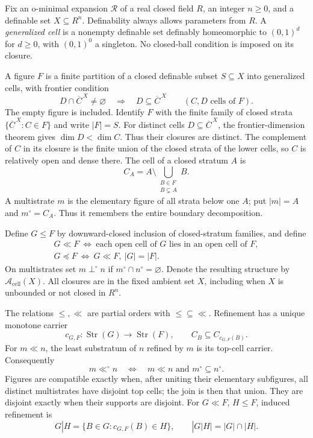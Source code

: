 \begin{definition}\label{SA21-BM-cell-definition}
Fix an o-minimal expansion \(\mathcal R\) of a real closed field \(R\),
an integer \(n\geq0\), and a definable set \(X\subseteq R^n\).
Definability always allows parameters from \(R\).
A \emph{generalized cell} is a nonempty definable set definably
homeomorphic to \((0,1)^d\) for \(d\geq0\), with \((0,1)^0\)
a singleton. No closed-ball condition is imposed on its closure.

A figure \(F\) is a finite partition of a closed definable
subset \(S\subseteq X\) into generalized cells, with frontier condition
\[
 D\cap\overline C^{\,X}\ne\varnothing
 \quad\Longrightarrow\quad D\subseteq\overline C^{\,X}
 \qquad(C,D\text{ cells of }F).
\]
The empty figure is included. Identify \(F\) with the finite
family of closed strata \(\{\overline C^{\,X}:C\in F\}\)
and write \(|F|=S\). For distinct cells \(D\subseteq\overline C^{\,X}\),
the frontier-dimension theorem
\citep[Theorem 3.22]{Coste1999} gives \(\dim D<\dim C\).
Thus their closures are distinct. The complement of \(C\)
in its closure is the finite union of the closed strata of
the lower cells, so \(C\) is relatively open and dense there.
The cell of a closed stratum \(A\) is
\[
 C_A=A\setminus\bigcup_{\substack{B\in F\\B\subsetneq A}}B.
\]
A multistrate \(m\) is the elementary figure of all strata
below one \(A\); put \(|m|=A\) and \(m^\circ=C_A\).
Thus it remembers the entire boundary decomposition.

Define \(G\leq F\) by downward-closed inclusion of closed-stratum
families, and define
\[
\begin{gathered}
 G\ll F\ \Longleftrightarrow\
 \text{each open cell of }G\text{ lies in an open cell of }F,\\
 G\preceq F\ \Longleftrightarrow\ G\ll F,\ |G|=|F|.
\end{gathered}
\]
On multistrates set \(m\perp^\circ n\) if
\(m^\circ\cap n^\circ=\varnothing\). Denote the resulting
structure by \(\mathcal A_{\mathrm{cell}}(X)\).
All closures are in the fixed ambient set \(X\), including
when \(X\) is unbounded or not closed in \(R^n\).
\end{definition}

\begin{lemma}\label{SA21-BM-cell-calculus}
The relations \(\leq,\ll\) are partial orders with
\(\leq\subseteq\ll\). Refinement has a unique monotone carrier
\[
 c_{G,F}:\operatorname{Str}(G)\longrightarrow\operatorname{Str}(F),
 \qquad C_B\subseteq C_{c_{G,F}(B)}.
\]
For \(m\ll n\), the least substratum of \(n\) refined by
\(m\) is its top-cell carrier. Consequently
\[
 m\ll^\circ n\quad\Longleftrightarrow\quad
 m\ll n\text{ and }m^\circ\subseteq n^\circ.
\]
Figures are compatible exactly when, after uniting their
elementary subfigures, all distinct multistrates have disjoint
top cells; the join is then that union. They are disjoint
exactly when their supports are disjoint. For \(G\ll F\),
\(H\leq F\), induced refinement is
\[
 G|H=\{B\in G:c_{G,F}(B)\in H\},
 \qquad |G|H|=|G|\cap|H|.
\]
\end{lemma}

